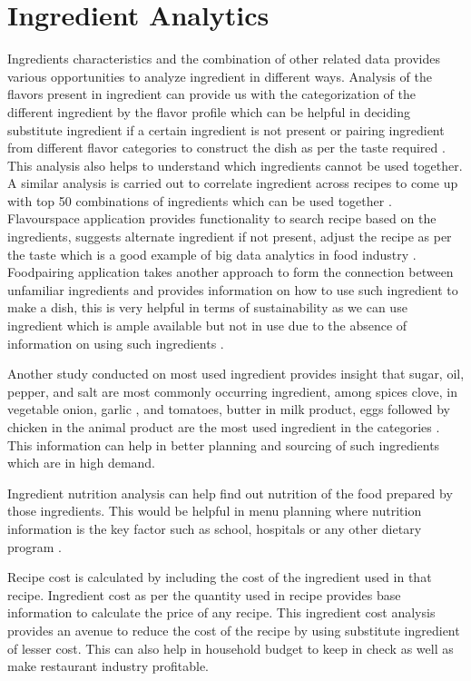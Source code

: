 \documentclass[sigconf]{acmart}
\begin{document}
\section{Ingredient Analytics}
Ingredients characteristics and the combination of other related data provides various opportunities to analyze ingredient in different ways. Analysis of the flavors present in ingredient can provide us with the categorization of the different ingredient by the flavor profile which can be helpful in deciding substitute ingredient if a certain ingredient is not present or pairing ingredient from different flavor categories to construct the dish as per the taste required \cite{Ahn2011}. This analysis also helps to understand which ingredients cannot be used together. A similar analysis is carried out to correlate ingredient across recipes to come up with top 50 combinations of ingredients which can be used together \cite{www-r-bloggers}. Flavourspace application provides functionality to search recipe based on the ingredients, suggests alternate ingredient if not present, adjust the recipe as per the taste which is a good example of big data analytics in food industry \cite{www-thecul}. Foodpairing application takes another approach to form the connection between unfamiliar ingredients and provides information on how to use such ingredient to make a dish, this is very helpful in terms of sustainability as we can use ingredient which is ample available but not in use due to the absence of information on using such ingredients \cite{www-foodtech}.

Another study conducted on most used ingredient provides insight that sugar, oil, pepper, and salt are most commonly occurring ingredient, among spices clove, in vegetable onion,  garlic , and tomatoes, butter in milk product, eggs followed by chicken in the animal product are the most used ingredient in the categories \cite{Chatterjee2016}. This information can help in better planning and sourcing of such ingredients which are in high demand.

Ingredient nutrition analysis can help find out nutrition of the food prepared by those ingredients. This would be helpful in menu planning where nutrition information is the key factor such as school, hospitals or any other dietary program \cite{www-onlinelibrary}.

Recipe cost is calculated by including the cost of the ingredient used in that recipe. Ingredient cost as per the quantity used in recipe provides base information to calculate the price of any recipe. This ingredient cost analysis provides an avenue to reduce the cost of the recipe by using substitute ingredient of lesser cost. This can also help in household budget to keep in check as well as make restaurant industry profitable.
\end{document}
